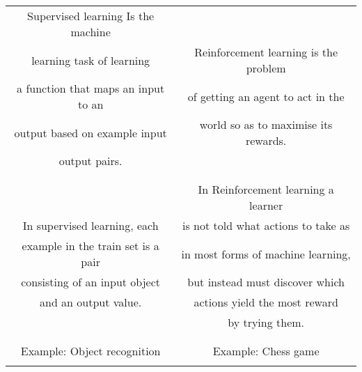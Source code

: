  \begin{tabular}{| c | c |} 
 \hline
 Supervised learning Is the machine  &      \\
 learning task of learning           & Reinforcement learning is the problem\\
 a function that maps an input to an & of getting an agent to act in the \\
 output based on example input       & world so as to maximise its rewards. \\
 output pairs.                       &  \\
                                     &      \\
 \hline
                                     &    \\
                                     & In Reinforcement learning a learner \\
 In supervised learning, each        & is not told what actions to take as\\
 example in the train set is a pair  & in most forms of machine learning,\\
 consisting of an input object       & but instead must discover which\\
 and an output value.                & actions yield the most reward\\
                                     & by trying them.\\
                                     &    \\
 \hline
                                     &    \\
Example: Object recognition          & Example: Chess game \\
                                     &    \\
 \hline
\end{tabular}

